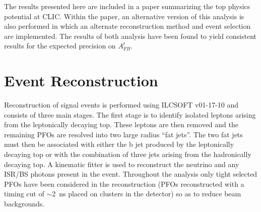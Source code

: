 The results presented here are included in a paper summarizing the top physics potential at \ac{CLIC}\cite{TopPaperDraft}. Within the paper, an alternative version of this analysis is also performed in which an alternate reconstruction method and event selection are implemented. The results of both analysis have been found to yield consistent results for the expected precision on $A_{FB}^{t}$.


\section{Event Reconstruction}
Reconstruction of signal events is performed using ILCSOFT v01-17-10 and consists of three main stages. The first stage is to identify isolated leptons arising from the leptonically decaying top. These leptons are then removed and the remaining PFOs are resolved into two large radius ``fat jets''. The two fat jets must then be associated with either the b jet produced by the leptonically decaying top or with the combination of three jets arising from the hadronically decaying top. A kinematic fitter is used to reconstruct the neutrino and any \ac{ISR}/\ac{BS} photons present in the event. Throughout the analysis only tight selected PFOs have been considered in the reconstruction (PFOs reconstructed with a timing cut of $\sim$2~ns placed on clusters in the detector\cite{cdrvol2}) so as to reduce beam backgrounds.

